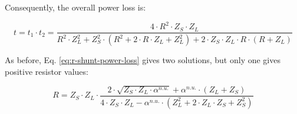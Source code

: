 \noindent Consequently, the overall power loss is:

\begin{equation}
    t = t_1 \cdot t_2 = \frac{4 \cdot R^2 \cdot Z_S \cdot Z_L}{R^2 \cdot Z_L^2 + Z_S^2 \cdot (R^2 + 2 \cdot R \cdot Z_L + Z_L^2) + 2 \cdot Z_S \cdot Z_L \cdot R \cdot (R  + Z_L)}
    \label{eq:r-shunt-power-loss}
\end{equation}

\noindent As before, Eq. \ref{eq:r-shunt-power-loss} gives two solutions, but only one gives positive resistor values:

\begin{equation}
    R = Z_S \cdot Z_L \cdot \frac{2 \cdot \sqrt{Z_S \cdot Z_L \cdot \alpha^{n.u.}} + \alpha^{n.u.}  \cdot \left( Z_L + Z_S\right)}{4 \cdot Z_S \cdot Z_L - \alpha^{n.u.} \cdot (Z_L^2 + 2 \cdot Z_L \cdot Z_S + Z_S^2)}
\end{equation}
\endinput

